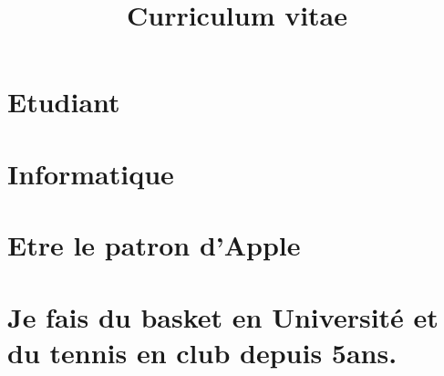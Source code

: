 \documentclass{article}
\title{Curriculum vitae}
\begin{document}
\maketitle

\section{Etudiant}
\section{Informatique}
\section{Etre le patron d'Apple}
\section{Je fais du basket en Université et du tennis en club depuis 5ans.}
\end{document}
